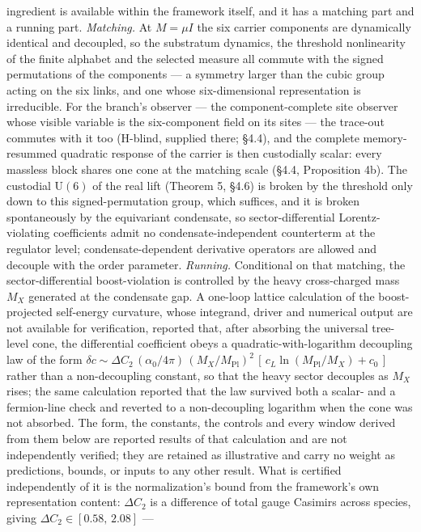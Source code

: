 \documentclass[
]{article}
\begin{document}
ingredient is available within the framework itself, and it has a
matching part and a running part. \emph{Matching.} At \(M = \mu I\) the
six carrier components are dynamically identical and decoupled, so the
substratum dynamics, the threshold nonlinearity of the finite alphabet
and the selected measure all commute with the signed permutations of the
components --- a symmetry larger than the cubic group acting on the six
links, and one whose six-dimensional representation is irreducible. For
the branch's observer --- the component-complete site observer whose
visible variable is the six-component field on its sites --- the
trace-out commutes with it too (H-blind, supplied there; §4.4), and the
complete memory-resummed quadratic response of the carrier is then
custodially scalar: every massless block shares one cone at the matching
scale (§4.4, Proposition 4b). The custodial \(\mathrm{U}(6)\) of the
real lift (Theorem 5, §4.6) is broken by the threshold only down to this
signed-permutation group, which suffices, and it is broken spontaneously
by the equivariant condensate, so sector-differential Lorentz-violating
coefficients admit no condensate-independent counterterm at the
regulator level; condensate-dependent derivative operators are allowed
and decouple with the order parameter. \emph{Running.} Conditional on
that matching, the sector-differential boost-violation is controlled by
the heavy cross-charged mass \(M_X\) generated at the condensate gap. A
one-loop lattice calculation of the boost-projected self-energy
curvature, whose integrand, driver and numerical output are not
available for verification, reported that, after absorbing the universal
tree-level cone, the differential coefficient obeys a
quadratic-with-logarithm decoupling law of the form
\(\delta c \sim \Delta C_2\,(\alpha_0/4\pi)\,(M_X/M_{\text{Pl}})^2\,[\,c_L\ln(M_{\text{Pl}}/M_X)+c_0\,]\)
rather than a non-decoupling constant, so that the heavy sector
decouples as \(M_X\) rises; the same calculation reported that the law
survived both a scalar- and a fermion-line check and reverted to a
non-decoupling logarithm when the cone was not absorbed. The form, the
constants, the controls and every window derived from them below are
reported results of that calculation and are not independently verified;
they are retained as illustrative and carry no weight as predictions,
bounds, or inputs to any other result. What is certified independently
of it is the normalization's bound from the framework's own
representation content: \(\Delta C_2\) is a difference of total gauge
Casimirs across species, giving \(\Delta C_2 \in [0.58,\,2.08]\) ---
\end{document}
